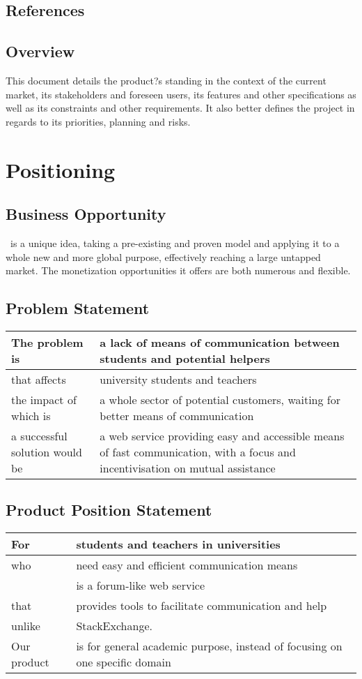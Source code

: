 \documentclass [a4paper, 12pt] {article}
\newcommand \projectname {\mbox{\bsc{Academi-co}}}
\begin{document}
\subsection{References}


\subsection{Overview}
This document details the product?s standing in the context of the current market, its stakeholders and foreseen users, its features and other specifications as well as its constraints and other requirements. It also better defines the project in regards to its priorities, planning and risks.



\section{Positioning}
\subsection{Business Opportunity}
\projectname \ is a unique idea, taking a pre-existing and proven model and applying it to a whole new and more global purpose, effectively reaching a large untapped market. The monetization opportunities it offers are both numerous and flexible.

\subsection{Problem Statement}
\begin{tabular}{| M{6cm} | M{8cm} |}
	\hline
	The problem is & a lack of means of communication between students and potential helpers \tabularnewline
	\hline
	that affects & university students and teachers \tabularnewline
	\hline
	the impact of which is & a whole sector of potential customers, waiting for better means of communication \tabularnewline
	\hline
	a successful solution would be & a web service providing easy and accessible means of fast communication, with a focus and incentivisation on mutual assistance \tabularnewline
	\hline
\end{tabular}

\subsection{Product Position Statement}
\begin{tabular}{| M{3cm} | M{11cm} |}
	\hline
	For & students and teachers in universities \tabularnewline
	\hline
	who & need easy and efficient communication means \tabularnewline
	\hline
	\projectname & is a forum-like web service \tabularnewline
	\hline
	that & provides tools to facilitate communication and help \tabularnewline
	\hline
	unlike & StackExchange. \tabularnewline
	\hline
	Our product & is for general academic purpose, instead of focusing on one specific domain \tabularnewline
	\hline
\end{tabular}
\end{document}
